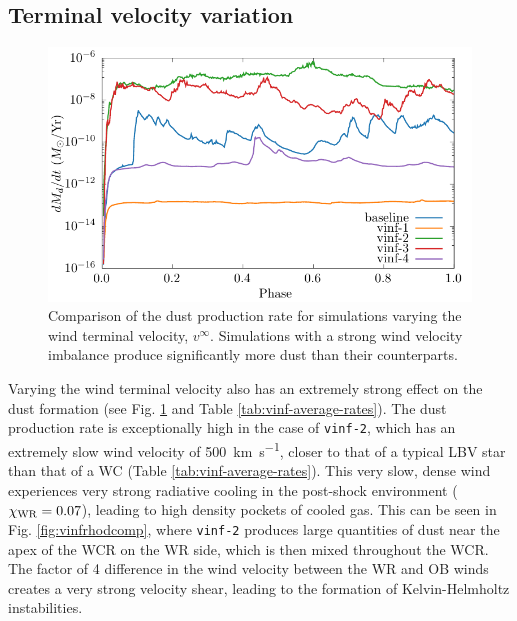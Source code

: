 \subsection{Terminal velocity variation}
\label{sec:paper1vinfresults}

\begin{figure}
  \centering
  \includegraphics{assets/vinf-phase-dust_rate.pdf}
  \caption[Comparison of the dust production rate for simulations varying $\vinf$]{Comparison of the dust production rate for simulations varying the wind terminal velocity, $v^\infty$. Simulations with a strong wind velocity imbalance produce significantly more dust than their counterparts.}
  \label{fig:vinfdustproduction}
\end{figure}

Varying the wind terminal velocity also has an extremely strong effect on the dust formation (see Fig. \ref{fig:vinfdustproduction} and Table \ref{tab:vinf-average-rates}).
The dust production rate is exceptionally high in the case of \texttt{vinf-2}, which has an extremely slow wind velocity of \SI{500}{\kilo\metre\per\second}, closer to that of a typical LBV star than that of a WC (Table \ref{tab:vinf-average-rates}).
This very slow, dense wind experiences very strong radiative cooling in the post-shock environment ($\chi_{\text{WR}} = 0.07$), leading to high density pockets of cooled gas.
This can be seen in Fig. \ref{fig:vinfrhodcomp}, where \texttt{vinf-2} produces large quantities of dust near the apex of the WCR on the WR side, which is then mixed throughout the WCR.
The factor of 4 difference in the wind velocity between the WR and OB winds creates a very strong velocity shear, leading to the formation of Kelvin-Helmholtz instabilities.

